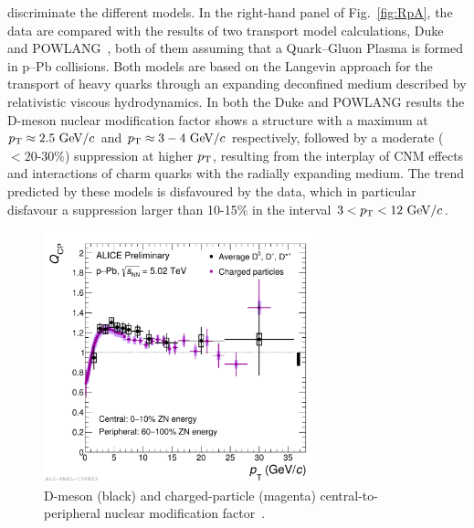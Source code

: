 discriminate the different models.
In the right-hand panel of Fig.~\ref{fig:RpA}, the data are 
compared with the results of two transport model 
calculations, Duke~\cite{Xu:2015iha} and 
POWLANG~\cite{Beraudo:2015wsd}, both of them assuming that a 
Quark--Gluon Plasma is formed in p--Pb collisions.
Both models are based on the Langevin approach for the transport of heavy 
quarks through an expanding deconfined medium described by relativistic viscous 
hydrodynamics. In both the Duke and POWLANG results the D-meson nuclear modification
factor shows a structure with a 
maximum at $p_{\rm T} \approx 2.5~\mathrm{GeV}/c$ and $p_{\rm T} \approx 3-4~\mathrm{GeV}/c$ respectively, followed by a moderate 
($<20$-30\%) suppression at higher $p_{\rm T}$,
resulting from the interplay of CNM effects and interactions of charm quarks with the
radially expanding medium.
The trend predicted by these models is disfavoured by the data, which in particular 
disfavour a suppression 
larger than 10-15\% in the interval $3<p_{\rm T}<12~\mathrm{GeV}/c$.\\
\begin{figure}[!ht]
  \centering
    \includegraphics[width=8cm]{FigCap2/2017-Sep-12-QCP-Daverage-ChargedHadrons.pdf}
  \caption{D-meson (black) and charged-particle (magenta) central-to-peripheral nuclear modification factor~\cite{ALICEPAS2017008}.}
  \label{fig:QCP}
\end{figure}





